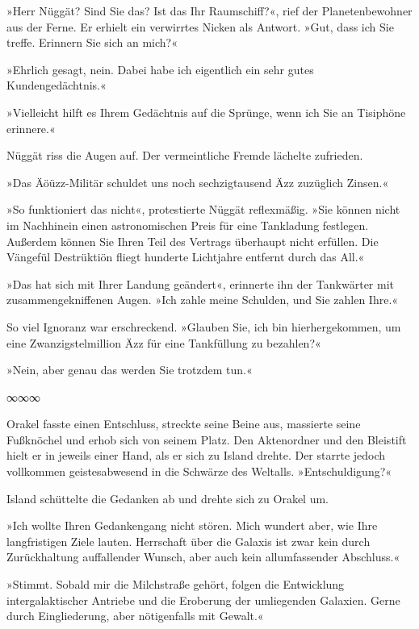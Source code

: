 »Herr Nüggät? Sind Sie das? Ist das Ihr Raumschiff?«, rief der Planetenbewohner aus der Ferne. Er erhielt ein verwirrtes Nicken als Antwort. »Gut, dass ich Sie treffe. Erinnern Sie sich an mich?«

»Ehrlich gesagt, nein. Dabei habe ich eigentlich ein sehr gutes Kundengedächtnis.«

»Vielleicht hilft es Ihrem Gedächtnis auf die Sprünge, wenn ich Sie an Tisiphöne erinnere.«

Nüggät riss die Augen auf. Der vermeintliche Fremde lächelte zufrieden.

»Das Äöüzz-Militär schuldet uns noch sechzigtausend Äzz zuzüglich Zinsen.«

»So funktioniert das nicht«, protestierte Nüggät reflexmäßig. »Sie können nicht im Nachhinein einen astronomischen Preis für eine Tankladung festlegen. Außerdem können Sie Ihren Teil des Vertrags überhaupt nicht erfüllen. Die Vängefül Destrüktiön fliegt hunderte Lichtjahre entfernt durch das All.«

»Das hat sich mit Ihrer Landung geändert«, erinnerte ihn der Tankwärter mit zusammengekniffenen Augen. »Ich zahle meine Schulden, und Sie zahlen Ihre.«

So viel Ignoranz war erschreckend. »Glauben Sie, ich bin hierhergekommen, um eine Zwanzigstelmillion Äzz für eine Tankfüllung zu bezahlen?«

»Nein, aber genau das werden Sie trotzdem tun.«

\begin{center}
∞∞∞
\end{center}

Orakel fasste einen Entschluss, streckte seine Beine aus, massierte seine Fußknöchel und erhob sich von seinem Platz. Den Aktenordner und den Bleistift hielt er in jeweils einer Hand, als er sich zu Island drehte. Der starrte jedoch vollkommen geistesabwesend in die Schwärze des Weltalls. »Entschuldigung?«

Island schüttelte die Gedanken ab und drehte sich zu Orakel um.

»Ich wollte Ihren Gedankengang nicht stören. Mich wundert aber, wie Ihre langfristigen Ziele lauten. Herrschaft über die Galaxis ist zwar kein durch Zurückhaltung auffallender Wunsch, aber auch kein allumfassender Abschluss.«

»Stimmt. Sobald mir die Milchstraße gehört, folgen die Entwicklung intergalaktischer Antriebe und die Eroberung der umliegenden Galaxien. Gerne durch Eingliederung, aber nötigenfalls mit Gewalt.«


